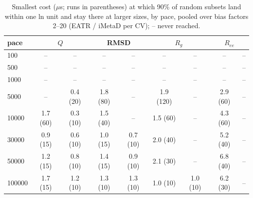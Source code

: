 \begin{table}[H]\centering
\caption{Smallest cost ($\mu$s; runs in parentheses) at which 90\% of random subsets land within one ln unit and stay there at larger sizes, by pace, pooled over bias factors 2--20 (EATR / iMetaD per CV); -- never reached.}\label{tab:s3}
\begin{tabular}{lcccccccc}\toprule
pace & \multicolumn{2}{c}{$Q$} & \multicolumn{2}{c}{RMSD} & \multicolumn{2}{c}{$R_g$} & \multicolumn{2}{c}{$R_{ee}$}\\ \midrule
100 & -- & -- & -- & -- & -- & -- & -- & -- \\
500 & -- & -- & -- & -- & -- & -- & -- & -- \\
1000 & -- & -- & -- & -- & -- & -- & -- & -- \\
5000 & -- & 0.4 (20) & 1.8 (80) & -- & 1.9 (120) & -- & 2.9 (60) & -- \\
10000 & 1.7 (60) & 0.3 (10) & 1.5 (40) & -- & 1.5 (60) & -- & 4.3 (60) & -- \\
30000 & 0.9 (15) & 0.6 (10) & 1.0 (15) & 0.7 (10) & 2.0 (40) & -- & 5.2 (40) & -- \\
50000 & 1.2 (15) & 0.8 (10) & 1.4 (15) & 0.9 (10) & 2.1 (30) & -- & 6.8 (40) & -- \\
100000 & 1.7 (15) & 1.2 (10) & 1.3 (10) & 1.3 (10) & 1.0 (10) & 1.0 (10) & 6.2 (30) & --\\ \bottomrule
\end{tabular}
\end{table}
